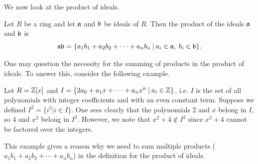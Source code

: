 We now look at the product of ideals.
\begin{definition}
    Let $R$ be a ring and let $\mathfrak{a}$ and $\mathfrak{b}$ be ideals of $R$. Then the product of the ideals $\mathfrak{a}$ and $\mathfrak{b}$ is
    \[
        \ideal{ab} = \{a_1b_1 + a_2b_2 + \cdots + a_nb_n \vert a_i\in\ideal{a},\;b_i\in\ideal{b}\}.
    \]
\end{definition}
One may question the necessity for the summing of products in the product of ideals. To answer this, consider the following example.
\begin{example}
    Let $R = \mathbb{Z}[x]$ and $I = \{2a_0 + a_1x + \cdots + a_nx^n \vert a_i \in \Z\}$, i.e. $I$ is the set of all polynomials with integer coefficients and with an even constant term. Suppose we defined $I^2 = \{i^2 \vert i \in I\}$. One sees clearly that the polynomials 2 and $x$ belong in $I$, so 4 and $x^2$ belong in $I^2$. However, we note that $x^2 + 4 \notin I^2$ since $x^2 + 4$ cannot be factored over the integers.

    This example gives a reason why we need to sum multiple products ($a_1b_1 + a_2b_2 + \cdots + a_nb_n$) in the definition for the product of ideals.
\end{example}


